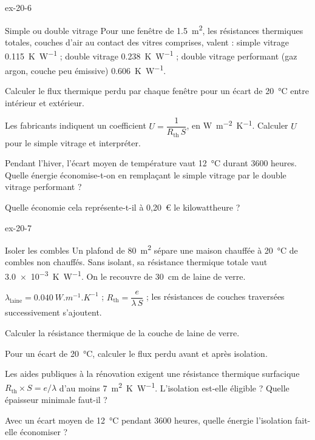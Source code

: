 \begin{blocLivre}{ex-20-6}
\begin{exercice}[2]{Simple ou double vitrage}
Pour une fenêtre de \qty{1,5}{m^2}, les résistances thermiques totales, couches d'air au contact des vitres comprises,
valent : simple vitrage \qty{0,115}{K.W^{-1}} ; double vitrage \qty{0,238}{K.W^{-1}} ; double vitrage performant (gaz argon,
couche peu émissive) \qty{0,606}{K.W^{-1}}.
\begin{questions}
\item Calculer le flux thermique perdu par chaque fenêtre pour un écart de \qty{20}{\degreeCelsius} entre intérieur et
extérieur.
\item Les fabricants indiquent un coefficient $U=\dfrac{1}{R_\mathrm{th}\,S}$, en \unit{W.m^{-2}.K^{-1}}. Calculer $U$ pour le simple
vitrage et interpréter.
\item Pendant l'hiver, l'écart moyen de température vaut \qty{12}{\degreeCelsius} durant \num{3600} heures. Quelle énergie
économise-t-on en remplaçant le simple vitrage par le double vitrage performant ?
\item Quelle économie cela représente-t-il à 0,20~€ le kilowattheure ?
\end{questions}
\end{exercice}
\end{blocLivre}
\begin{blocLivre}{ex-20-7}
\begin{exercice}[2]{Isoler les combles}
Un plafond de \qty{80}{m^2} sépare une maison chauffée à \qty{20}{\degreeCelsius} de combles non chauffés. Sans isolant, sa
résistance thermique totale vaut \qty{3,0e-3}{K.W^{-1}}. On le recouvre de \qty{30}{cm} de laine de verre.
\begin{donnees}
$\lambda_\mathrm{laine}=\qty{0,040}{W.m^{-1}.K^{-1}}$ ; $R_\mathrm{th}=\dfrac{e}{\lambda\,S}$ ; les résistances de couches traversées
successivement s'ajoutent.
\end{donnees}
\begin{questions}
\item Calculer la résistance thermique de la couche de laine de verre.
\item Pour un écart de \qty{20}{\degreeCelsius}, calculer le flux perdu avant et après isolation.
\item Les aides publiques à la rénovation exigent une résistance thermique surfacique $R_\mathrm{th}\times S=e/\lambda$ d'au
moins \qty{7}{m^2.K.W^{-1}}. L'isolation est-elle éligible ? Quelle épaisseur minimale faut-il ?
\item Avec un écart moyen de \qty{12}{\degreeCelsius} pendant \num{3600} heures, quelle énergie l'isolation fait-elle
économiser ?
\end{questions}
\end{exercice}
\end{blocLivre}

